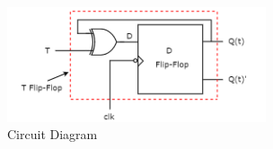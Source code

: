 \documentclass{article}
\begin{document}
\begin{figure}
\centering
\includegraphics[width=3in]{circuit_diagram_of_t_flip_flop.png}
\caption{Circuit Diagram}

\end{figure}
\end{document}
